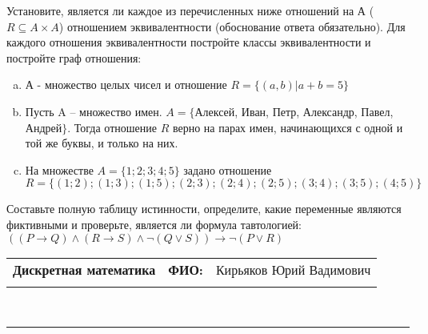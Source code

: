 \documentclass[10pt]{exam}
\newcommand{\class}{Дискретная математика}
\newcommand{\examdate}{}
\begin{document}
\begin{questions}
\question
Установите, является ли каждое из перечисленных ниже отношений на А ($R \subseteq A \times A$) отношением эквивалентности (обоснование ответа обязательно). Для каждого отношения эквивалентности постройте классы 
эквивалентности и постройте граф отношения:
\begin{enumerate} [a)]\setcounter{enumi}{0}
\item А - множество целых чисел и отношение $R = \{(a,b)|a + b = 5\}$
\item Пусть A – множество имен. $A = \{ $Алексей, Иван, Петр, Александр, Павел, Андрей$ \}$. Тогда отношение $R $ верно на парах имен, начинающихся с одной и той же буквы, и только на них.
\item На множестве $A = \{1; 2; 3; 4; 5\}$ задано отношение $R = \{(1; 2); (1; 3); (1; 5); (2; 3); (2; 4); (2; 5); (3; 4); (3; 5); (4; 5)\}$
\end{enumerate}\question Составьте полную таблицу истинности, определите, какие переменные являются фиктивными и проверьте, является ли формула тавтологией:
$((P \rightarrow Q) \land (R \rightarrow S) \land \neg (Q \lor S)) \rightarrow \neg (P \lor R)$

\end{questions}
\newpage
\begin{flushright}
\begin{tabular}{p{2.8in} r l}
\textbf{\class} & \textbf{ФИО:} &Кирьяков Юрий Вадимович
\\

\textbf{\examdate} &&\\
\end{tabular}\\
\end{flushright}
\rule[1ex]{\textwidth}{.1pt}
\end{document}
